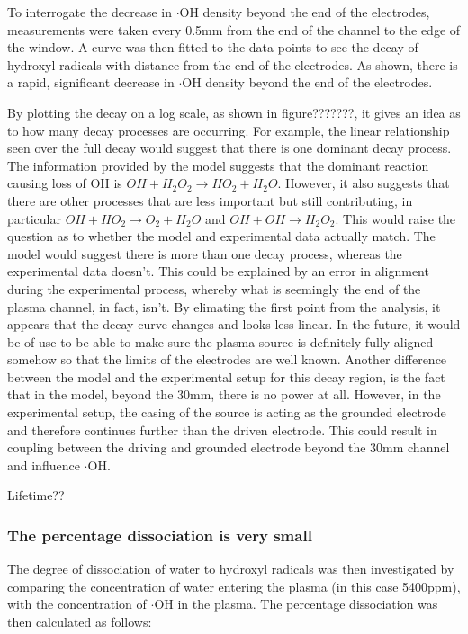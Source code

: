 \documentclass[11pt, oneside]{article}   	%
\begin{document}
To interrogate the decrease in $\cdot$OH density beyond the end of the electrodes, measurements were taken every 0.5mm from the end of the channel to the edge of the window.
A curve was then fitted to the data points to see the decay of hydroxyl radicals with distance from the end of the electrodes.
As shown, there is a rapid, significant decrease in $\cdot$OH density beyond the end of the electrodes.

By plotting the decay on a log scale, as shown in figure???????, it gives an idea as to how many decay processes are occurring. For example, the linear relationship seen over the full decay would suggest that there is one dominant decay process. 
The information provided by the model suggests that the dominant reaction causing loss of OH is $OH + H_2O_2 \rightarrow  HO_2 + H_2O$. However, it also suggests that there are other processes that are less important but still contributing, in particular $OH +HO_2 \rightarrow O_2 +H_2O$ and  $OH + OH \rightarrow H_2O_2$.
This would raise the question as to whether the model and experimental data actually match. The model would suggest there is more than one decay process, whereas the experimental data doesn't.
This could be explained by an error in alignment during the experimental process, whereby what is seemingly the end of the plasma channel, in fact, isn't. 
By elimating the first point from the analysis, it appears that the decay curve changes and looks less linear.
In the future, it would be of use to be able to make sure the plasma source is definitely fully aligned somehow so that the limits of the electrodes are well known.
Another difference between the model and the experimental setup for this decay region, is the fact that in the model, beyond the 30mm, there is no power at all. However, in the experimental setup, the casing of the source is acting as the grounded electrode and therefore continues further than the driven electrode. This could result in coupling between the driving and grounded electrode beyond the 30mm channel and influence $\cdot$OH.


Lifetime??


\subsubsection{The percentage dissociation is very small}

The degree of dissociation of water to hydroxyl radicals was then investigated by comparing the concentration of water entering the plasma (in this case 5400ppm), with the concentration of $\cdot$OH in the plasma.
The percentage dissociation was then calculated as follows:
\end{document}
